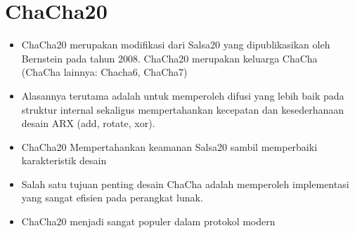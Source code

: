 \documentclass{article}
\begin{document}

\section*{ChaCha20}

\begin{itemize}
    \item ChaCha20 merupakan modifikasi dari Salsa20 yang dipublikasikan oleh Bernstein pada tahun 2008. ChaCha20 merupakan keluarga ChaCha (ChaCha lainnya: Chacha6, ChaCha7)
    \item Alasannya terutama adalah untuk memperoleh difusi yang lebih baik pada struktur internal sekaligus mempertahankan kecepatan dan kesederhanaan desain ARX (add, rotate, xor).
    \item ChaCha20 Mempertahankan keamanan Salsa20 sambil memperbaiki karakteristik desain
    \item Salah satu tujuan penting desain ChaCha adalah memperoleh implementasi yang sangat efisien pada perangkat lunak.
    \item ChaCha20 menjadi sangat populer dalam protokol modern
\end{itemize}
\end{document}
